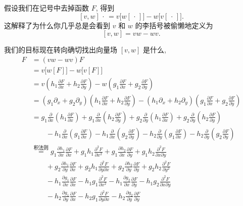 假设我们在记号中去掉函数 $F$, 得到
\[
[v,w]\,\cdot\,=v\bigl[w[\,\cdot\,]\bigr]-w\bigl[v[\,\cdot\,]\bigr].
\]
这解释了为什么你几乎总是会看到 $v$ 和 $w$ 的李括号被偷懒地定义为
\[
[v,w]=vw-wv.
\]

我们的目标现在转向确切找出向量场 $[v,w]$ 是什么, 
\begin{align*}
[v,w]F&=(vw-wv)F\\
&=v\bigl[w[F]\bigr]-w\bigl[v[F]\bigr]\\
&=v\left(h_1\frac{\partial F}{\partial x}+h_2\frac{\partial F}{\partial y}\right)
-w\left(g_1\frac{\partial F}{\partial x}+g_2\frac{\partial F}{\partial y}\right)\\
&=(g_1\partial_x+g_2\partial_y)\left(h_1\frac{\partial F}{\partial x}+h_2\frac{\partial F}{\partial y}\right)
-(h_1\partial_x+h_2\partial_y)\left(g_1\frac{\partial F}{\partial x}+g_2\frac{\partial F}{\partial y}\right)\\
&=g_1\frac{\partial}{\partial x}\left(h_1\frac{\partial F}{\partial x}\right)
+g_1\frac{\partial}{\partial x}\left(h_2\frac{\partial F}{\partial y}\right)
+g_2\frac{\partial}{\partial y}\left(h_1\frac{\partial F}{\partial x}\right)
+g_2\frac{\partial}{\partial y}\left(h_2\frac{\partial F}{\partial y}\right)\\
&\qquad-h_1\frac{\partial}{\partial x}\left(g_1\frac{\partial F}{\partial x}\right)
-h_1\frac{\partial}{\partial x}\left(g_2\frac{\partial F}{\partial y}\right)
-h_2\frac{\partial}{\partial y}\left(g_1\frac{\partial F}{\partial x}\right)
-h_2\frac{\partial}{\partial y}\left(g_2\frac{\partial F}{\partial y}\right)\\
&\overset{\text{积法则}}{=}g_1\frac{\partial h_1}{\partial x}\frac{\partial F}{\partial x}
+g_1h_1\frac{\partial^2 F}{\partial x^2}
+g_1\frac{\partial h_2}{\partial x}\frac{\partial F}{\partial y}
+g_1h_2\frac{\partial^2 F}{\partial x\partial y}\\
&\qquad+g_2\frac{\partial h_1}{\partial y}\frac{\partial F}{\partial x}
+g_2h_1\frac{\partial^2 F}{\partial y\partial x}
+g_2\frac{\partial h_2}{\partial y}\frac{\partial F}{\partial y}
+g_2h_2\frac{\partial^2 F}{\partial y^2}\\
&\qquad-h_1\frac{\partial g_1}{\partial x}\frac{\partial F}{\partial x}
-h_1g_1\frac{\partial^2 F}{\partial x^2}
-h_1\frac{\partial g_2}{\partial x}\frac{\partial F}{\partial y}
-h_1g_2\frac{\partial^2 F}{\partial x\partial y}\\
&\qquad-h_2\frac{\partial g_1}{\partial y}\frac{\partial F}{\partial x}
-h_2g_1\frac{\partial^2 F}{\partial y\partial x}
-h_2\frac{\partial g_2}{\partial y}\frac{\partial F}{\partial y}

\end{align*}
